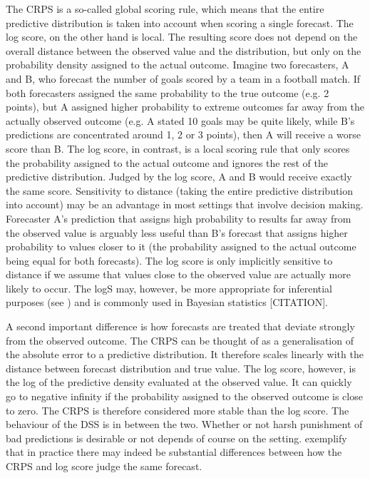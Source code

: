 \documentclass[article,shortnames]{jss}
\begin{document}
The CRPS is a so-called global scoring rule, which means that the entire predictive distribution is taken into account when scoring a single forecast. The log score, on the other hand is local. The resulting score does not depend on the overall distance between the observed value and the distribution, but only on the probability density assigned to the actual outcome. Imagine two forecasters, A and B, who forecast the number of goals scored by a team in a football match. If both forecasters assigned the same probability to the true outcome (e.g. 2 points), but A assigned higher probability to extreme outcomes far away from the actually observed outcome (e.g. A stated 10 goals may be quite likely, while B's predictions are concentrated around 1, 2 or 3 points), then A will receive a worse score than B. The log score, in contrast, is a local scoring rule that only scores the probability assigned to the actual outcome and ignores the rest of the predictive distribution. Judged by the log score, A and B would receive exactly the same score. Sensitivity to distance (taking the entire predictive distribution into account) may be an advantage in most settings that involve decision making. Forecaster A's prediction that assigns high probability to results far away from the observed value is arguably less useful than B's forecast that assigns higher probability to values closer to it (the probability assigned to the actual outcome being equal for both forecasts). The log score is only implicitly sensitive to distance if we assume that values close to the observed value are actually more likely to occur. The logS may, however, be more appropriate for inferential purposes (see \cite{winklerScoringRulesEvaluation1996}) and is commonly used in Bayesian statistics [CITATION]. 

A second important difference is how forecasts are treated that deviate strongly from the observed outcome. The CRPS can be thought of as a generalisation of the absolute error to a predictive distribution. It therefore scales linearly with the distance between forecast distribution and true value. The log score, however, is the log of the predictive density evaluated at the observed value. It can quickly go to negative infinity if the probability assigned to the observed outcome is close to zero. The CRPS is therefore considered more stable than the log score. The behaviour of the DSS is in between the two. Whether or not harsh punishment of bad predictions is desirable or not depends of course on the setting. \cite{bracherEvaluatingEpidemicForecasts2021} exemplify that in practice there may indeed be substantial differences between how the CRPS and log score judge the same forecast. 
\end{document}
